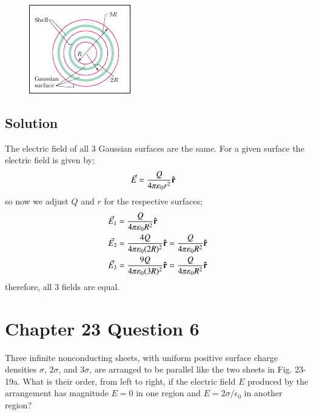 \documentclass{article}
\begin{document}
\begin{figure}[ht]
    \centering
    \includegraphics[scale=0.75]{image.png}
\end{figure}

\subsection*{Solution}
The electric field of all 3 Gaussian surfaces are the same. For a given surface the electric field is given by;
\begin{align*}
    \vec{E} &= \frac{Q}{4\pi \varepsilon_0 r^2} \vu r
\end{align*}
so now we adjust $Q$ and $r$ for the respective surfaces;
\begin{align*}
    \vec{E}_1 &= \frac{Q}{4\pi \varepsilon_0 R^2} \vu r \\
    \vec{E}_2 &= \frac{4Q}{4\pi \varepsilon_0 (2R)^2} \vu r  = \frac{Q}{4\pi \varepsilon_0 R^2} \vu r \\
    \vec{E}_3 &= \frac{9Q}{4\pi \varepsilon_0 (3R)^2} \vu r = \frac{Q}{4\pi \varepsilon_0 R^2} \vu r
\end{align*}
therefore, all 3 fields are equal.

\section*{Chapter 23 Question 6}
Three infinite nonconducting sheets, with uniform positive surface charge densities $\sigma$, $2\sigma$, and $3\sigma$, are arranged to be parallel like the two sheets in Fig. 23-19a. What is their order, from left to right, if the electric field $E$ produced by the arrangement has magnitude $E = 0$ in one region and $E = 2\sigma/\epsilon_0$ in another region?
\end{document}
